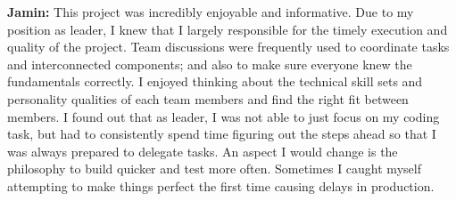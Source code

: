 \documentclass[11pt]{article}
\begin{document}
\textbf{Jamin:} This project was incredibly enjoyable and informative. Due to my position as leader, I knew that I largely responsible for the timely execution and quality of the project. Team discussions were frequently used to coordinate tasks and interconnected components; and also to make sure everyone knew the fundamentals correctly. I enjoyed thinking about the technical skill sets and personality qualities of each team members and find the right fit between members. I found out that as leader, I was not able to just focus on my coding task, but had to consistently spend time figuring out the steps ahead so that I was always prepared to delegate tasks.
An aspect I would change is the philosophy to build quicker and test more often. Sometimes I caught myself attempting to make things perfect the first time causing delays in production.
\end{document}
